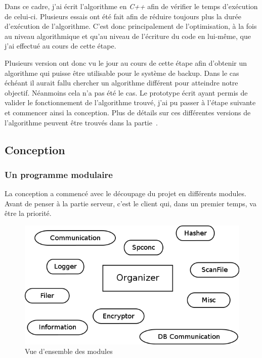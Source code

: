 \documentclass[a4paper,10pt, twoside]{report}
\begin{document}
\begin{spacing}{1.2}
Dans ce cadre, j'ai \'ecrit l'algorithme en \textit{C++} afin de v\'erifier
le temps d'ex\'ecution de celui-ci. Plusieurs essais ont \'et\'e fait afin de
r\'eduire toujours plus la dur\'ee d'ex\'ecution de l'algorithme. C'est donc
principalement de l'optimisation, \`a la fois au niveau algorithmique et
qu'au niveau de l'\'ecriture du code en lui-m\^eme, que j'ai effectu\'e  au
cours de cette \'etape.

Plusieurs version ont donc vu le jour au cours de cette \'etape afin d'obtenir
un algorithme qui puisse \^etre utilisable pour le syst\`eme de backup. Dans
le cas \'ech\'eant il aurait fallu chercher un algorithme diff\'erent pour
atteindre notre objectif. N\'eanmoins cela n'a pas \'et\'e le cas. Le
prototype \'ecrit ayant permis de valider le fonctionnement de l'algorithme
trouv\'e, j'ai pu passer \`a l'\'etape suivante et commencer ainsi la
conception.
Plus de d\'etails sur ces diff\'erentes versions de l'algorithme peuvent \^etre
trouv\'es dans la partie~.

\subsection{Conception}
\subsubsection{Un programme modulaire}
La conception a commenc\'e avec le d\'ecoupage du projet en diff\'erents
modules. Avant de penser \`a la partie serveur, c'est le client qui, dans un
premier temps, va \^etre la priorit\'e.

\begin{figure}[h!]
  \centering
  \includegraphics[scale=0.51]{softwareDesign/overviewModule.png}
  \caption{\label{overviewModule} Vue d'ensemble des modules}
\end{figure}


\end{spacing}
\end{document}

